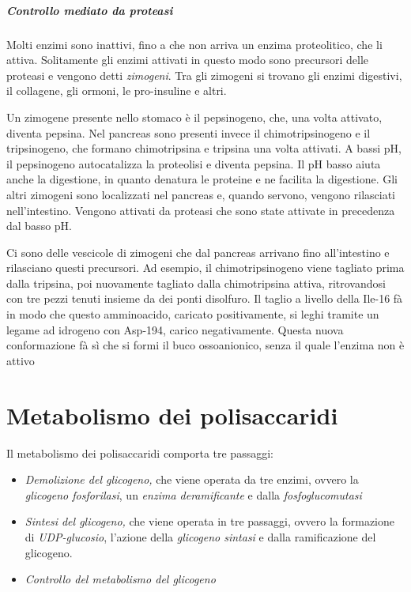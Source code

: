 \paragraph{Controllo mediato da proteasi}
Molti enzimi sono inattivi, fino a che non arriva un enzima proteolitico, che li attiva. Solitamente gli enzimi attivati in questo modo sono precursori delle proteasi e vengono detti \emph{zimogeni}. Tra gli zimogeni si trovano gli enzimi digestivi, il collagene, gli ormoni, le pro-insuline e altri.

Un zimogene presente nello stomaco è il pepsinogeno, che, una volta attivato, diventa pepsina. Nel pancreas sono presenti invece il chimotripsinogeno e il tripsinogeno, che formano chimotripsina e tripsina una volta attivati.
A bassi pH, il pepsinogeno autocatalizza la proteolisi e diventa pepsina. Il pH basso aiuta anche la digestione, in quanto denatura le proteine e ne facilita la digestione. Gli altri zimogeni sono localizzati nel pancreas e, quando servono, vengono rilasciati nell'intestino. Vengono attivati da proteasi che sono state attivate in precedenza dal basso pH.

Ci sono delle vescicole di zimogeni che dal pancreas arrivano fino all'intestino e rilasciano questi precursori. Ad esempio, il chimotripsinogeno viene tagliato prima dalla tripsina, poi nuovamente tagliato dalla chimotripsina attiva, ritrovandosi con tre pezzi tenuti insieme da dei ponti disolfuro.
Il taglio a livello della Ile-16 fà in modo che questo amminoacido, caricato positivamente, si leghi tramite un legame ad idrogeno con Asp-194, carico negativamente. Questa nuova conformazione fà sì che si formi il buco ossoanionico, senza il quale l'enzima non è attivo

\chapter{Metabolismo dei polisaccaridi}

Il metabolismo dei polisaccaridi comporta tre passaggi:
\begin{itemize}
\item \emph{Demolizione del glicogeno,} che viene operata da tre enzimi, ovvero la \emph{glicogeno fosforilasi}, un \emph{enzima deramificante} e dalla \emph{fosfoglucomutasi}
\item \emph{Sintesi del glicogeno,} che viene operata in tre passaggi, ovvero la formazione di \emph{UDP-glucosio}, l'azione della \emph{glicogeno sintasi} e dalla ramificazione del glicogeno.
\item \emph{Controllo del metabolismo del glicogeno}
\end{itemize}


